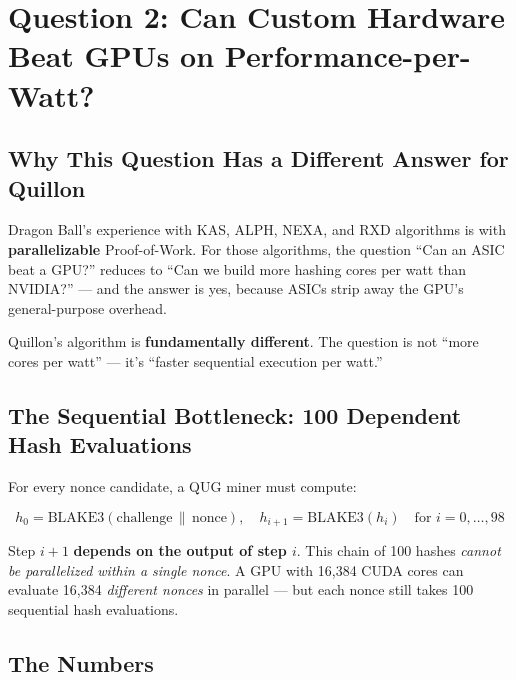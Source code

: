 \documentclass[11pt,a4paper]{article}
\begin{document}
\section{Question 2: Can Custom Hardware Beat GPUs on Performance-per-Watt?}

\subsection{Why This Question Has a Different Answer for Quillon}

Dragon Ball's experience with KAS, ALPH, NEXA, and RXD algorithms is with \textbf{parallelizable} Proof-of-Work. For those algorithms, the question ``Can an ASIC beat a GPU?'' reduces to ``Can we build more hashing cores per watt than NVIDIA?'' --- and the answer is yes, because ASICs strip away the GPU's general-purpose overhead.

Quillon's algorithm is \textbf{fundamentally different}. The question is not ``more cores per watt'' --- it's ``faster sequential execution per watt.''

\subsection{The Sequential Bottleneck: 100 Dependent Hash Evaluations}

For every nonce candidate, a QUG miner must compute:

\begin{equation}
h_0 = \text{BLAKE3}(\text{challenge} \,\|\, \text{nonce}), \quad
h_{i+1} = \text{BLAKE3}(h_i) \quad \text{for } i = 0, \ldots, 98
\end{equation}

Step $i+1$ \textbf{depends on the output of step $i$}. This chain of 100 hashes \textit{cannot be parallelized within a single nonce}. A GPU with 16,384 CUDA cores can evaluate 16,384 \textit{different nonces} in parallel --- but each nonce still takes 100 sequential hash evaluations.

\subsection{The Numbers}
\end{document}
